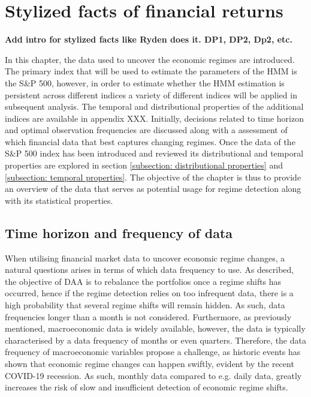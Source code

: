 \section{Stylized facts of financial returns}
\label{section: Data}

\textbf{Add intro for stylized facts like Ryden does it. DP1, DP2, Dp2, etc.}

In this chapter, the data used to uncover the economic regimes are introduced. The primary index that will be used to estimate the parameters of the HMM is the S\&P 500, however, in order to estimate whether the HMM estimation is persistent across different indices a variety of different indices will be applied in subsequent analysis. The temporal and distributional properties of the additional indices are available in appendix XXX. Initially, decisions related to time horizon and optimal observation frequencies are discussed along with a assessment of which financial data that best captures changing regimes. Once the data of the S\&P 500 index has been introduced and reviewed its distributional and temporal properties are explored in section \ref{subsection: distributional properties} and \ref{subsection: temporal properties}. The objective of the chapter is thus to provide an overview of the data that serves as potential usage for regime detection along with its statistical properties.  

\subsection{Time horizon and frequency of data}
\label{subsection: Data frequency}
When utilising financial market data to uncover economic regime changes, a natural questions arises in terms of which data frequency to use. As described, the objective of DAA is to rebalance the portfolios once a regime shifts has occurred, hence if the regime detection relies on too infrequent data, there is a high probability that several regime shifts will remain hidden. As such, data frequencies longer than a month is not considered. Furthermore, as previously mentioned, macroeconomic data is widely available, however, the data is typically characterised by a data frequency of months or even quarters. Therefore, the data frequency of macroeconomic variables propose a challenge, as historic events has shown that economic regime changes can happen swiftly, evident by the recent COVID-19 recession. As such, monthly data compared to e.g. daily data, greatly increases the risk of slow and insufficient detection of economic regime shifts.
 
